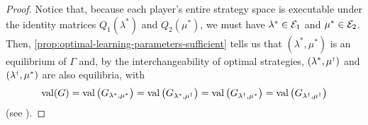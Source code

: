     \begin{proof}
        Notice that, because each player's entire strategy space is executable under the identity matrices $Q_1(\lambda^*)$ and $Q_2(\mu^*)$, we must have $\lambda^* \in \mathcal{E}_1$ and $\mu^* \in \mathcal{E}_2$.
        Then, \autoref{prop:optimal-learning-parameters-sufficient} tells us that $(\lambda^*, \mu^*)$ is an equilibrium of $\Gamma$ and, by the interchangeability of optimal strategies, $(\lambda^*, \mu^\sdagger)$ and $(\lambda^\sdagger, \mu^*)$ are also equilibria, with
        \begin{equation}  \label{temp:optimal-learning-parameters-necessary-1}
            \val(G)
                = \val\big(G_{\lambda^*, \mu^*}\big)
                = \val\big(G_{\lambda^*, \mu^\sdagger}\big)
                = \val\big(G_{\lambda^\sdagger, \mu^*}\big)
                = \val\big(G_{\lambda^\sdagger, \mu^\sdagger}\big)
        \end{equation}
        (see \parencite[Theorem 2.1.2]{Owen2013}).
    

\end{proof}
